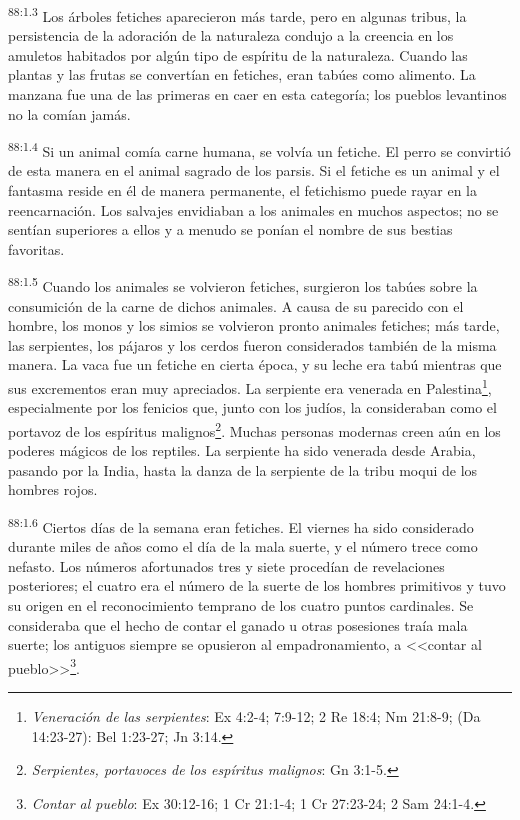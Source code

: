 \par
\textsuperscript{88:1.3} Los árboles fetiches aparecieron más tarde, pero en algunas tribus, la persistencia de la adoración de la naturaleza condujo a la creencia en los amuletos habitados por algún tipo de espíritu de la naturaleza. Cuando las plantas y las frutas se convertían en fetiches, eran tabúes como alimento. La manzana fue una de las primeras en caer en esta categoría; los pueblos levantinos no la comían jamás.

\par
\textsuperscript{88:1.4} Si un animal comía carne humana, se volvía un fetiche. El perro se convirtió de esta manera en el animal sagrado de los parsis. Si el fetiche es un animal y el fantasma reside en él de manera permanente, el fetichismo puede rayar en la reencarnación. Los salvajes envidiaban a los animales en muchos aspectos; no se sentían superiores a ellos y a menudo se ponían el nombre de sus bestias favoritas.

\par
\textsuperscript{88:1.5} Cuando los animales se volvieron fetiches, surgieron los tabúes sobre la consumición de la carne de dichos animales. A causa de su parecido con el hombre, los monos y los simios se volvieron pronto animales fetiches; más tarde, las serpientes, los pájaros y los cerdos fueron considerados también de la misma manera. La vaca fue un fetiche en cierta época, y su leche era tabú mientras que sus excrementos eran muy apreciados. La serpiente era venerada en Palestina\footnote{\textit{Veneración de las serpientes}: Ex 4:2-4; 7:9-12; 2 Re 18:4; Nm 21:8-9; (Da 14:23-27): Bel 1:23-27; Jn 3:14.}, especialmente por los fenicios que, junto con los judíos, la consideraban como el portavoz de los espíritus malignos\footnote{\textit{Serpientes, portavoces de los espíritus malignos}: Gn 3:1-5.}. Muchas personas modernas creen aún en los poderes mágicos de los reptiles. La serpiente ha sido venerada desde Arabia, pasando por la India, hasta la danza de la serpiente de la tribu moqui de los hombres rojos.

\par
\textsuperscript{88:1.6} Ciertos días de la semana eran fetiches. El viernes ha sido considerado durante miles de años como el día de la mala suerte, y el número trece como nefasto. Los números afortunados tres y siete procedían de revelaciones posteriores; el cuatro era el número de la suerte de los hombres primitivos y tuvo su origen en el reconocimiento temprano de los cuatro puntos cardinales. Se consideraba que el hecho de contar el ganado u otras posesiones traía mala suerte; los antiguos siempre se opusieron al empadronamiento, a <<contar al pueblo>>\footnote{\textit{Contar al pueblo}: Ex 30:12-16; 1 Cr 21:1-4; 1 Cr 27:23-24; 2 Sam 24:1-4.}.

